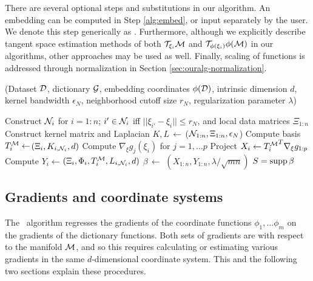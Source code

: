 There are several optional steps and substitutions in our algorithm.
An embedding can be computed in Step \ref{alg:embed}, or input separately by the user.
We denote this step generically as \embedalg.
Furthermore, although we explicitly describe tangent space estimation methods of both ${\cal T}_{\xi_i} {\cal M}$ and ${\cal T}_{\phi(\xi_i)} \phi ({\cal M})$ in our algorithms, other approaches may be used as well.
Finally, scaling of functions is addressed through normalization in Section \ref{sec:ouralg-normalization}.

%
\begin{algorithm}[H]
\renewcommand{\thealgorithm}{}
\caption{(Dataset ${\cal D}$, dictionary ${\cal G}$, embedding coordinates $\phi({\cal D})$,  intrinsic dimension $d$, kernel bandwidth $\epsilon_N$, neighborhood cutoff size $r_N$, regularization parameter $\lambda$)}
\begin{algorithmic}[1]
\STATE Construct ${\cal N}_i$ for $i=1:n$; $i'\in {\cal N}_i$ iff $||\xi_{i'}-\xi_{i}||\leq r_N$, and local data matrices $\Xi_{1:n}$ \label{alg:neb}
\STATE Construct kernel matrix and Laplacian $K, L\,\gets\,$\lapalg(${\cal N}_{1:n},\Xi_{1:n},\epsilon_N$) \label{alg:lap}
 \label{alg:embed}
  \STATE Compute basis  ${T_i^{\cal M}} \gets $\tppalg$(\Xi_i, K_{i, {\cal N}_i},d)$ \label{alg:tan}
  \STATE Compute $\nabla_\xi g_j (\xi_i)$ for $j=1,\ldots p$ \label{alg:dict}
  \STATE Project $X_i\gets {T_i^{\cal M}}^T\nabla_\xi g_{1:p}$ \label{alg:dict_proj}
  \STATE Compute $Y_i \gets$\dpullalg$(\Xi_i, \Phi_{i},T_i^{\cal M},  L_{i, {\cal N}_i},  d)$ \label{alg:pb} \label{alg:prob}
  \ENDFOR
\STATE $\beta\,\gets$ \flassoalg$(X_{1:n}, Y_{1:n}, \lambda/\sqrt{mn})$ \label{alg:glasso}
 $S=\operatorname{supp} \beta$ 
\end{algorithmic}
\end{algorithm}

\subsection{Gradients and coordinate systems}
\label{sec:explain-dphi}

The \ouralg~algorithm regresses the gradients of the coordinate
functions $\phi_{1},\ldots \phi_m$ on the
gradients of the dictionary functions.
Both sets of gradients are with respect to the manifold ${\cal M}$, and so this requires calculating or estimating various gradients in the
same $d$-dimensional coordinate system.
This and the following two sections explain these procedures. 

